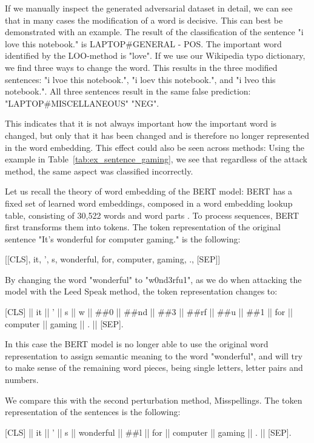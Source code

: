 If we manually inspect the generated adversarial dataset in detail, we can see that in many cases the modification of a word is decisive. This can best be demonstrated with an example. 
The result of the classification of the sentence "i love this notebook." is LAPTOP\#GENERAL - POS. The important word identified by the LOO-method is "love". If we use our Wikipedia typo dictionary, we find three ways to change the word. This results in the three modified sentences: "i lvoe this notebook.", "i loev this notebook.", and "i lveo this notebook.".
All three sentences result in the same false prediction:
"LAPTOP\#MISCELLANEOUS" "NEG".

This indicates that it is not always important how the important word is changed, but only that it has been changed and is therefore no longer represented in the word embedding. This effect could also be seen across methods: 
Using the example in Table~\ref{tab:ex_sentence_gaming}, we see that regardless of the attack method, the same aspect was classified incorrectly. 

Let us recall the theory of word embedding of the BERT model:
BERT has a fixed set of learned word embeddings, composed in a word embedding lookup table, consisting of 30,522 words and word parts \cite{devlin2018bert}. To process sequences, BERT first transforms them into tokens. The token representation of the original sentence "It’s wonderful for computer gaming." is the following:

\begin{center}
    [{[}CLS{]},  it, ', s, wonderful, for, computer, gaming,  ., {[}SEP{]]}
\end{center}


By changing the word "wonderful" to "w0nd3rfu1", as we do when attacking the model with the Leed Speak method, the token representation changes to:

{[}CLS{]}  ||  it  ||  '  ||  s  ||  w  ||  \#\#0  ||  \#\#nd  ||  \#\#3  ||  \#\#rf  ||  \#\#u  ||  \#\#1  ||  for  ||  computer  ||  gaming  ||  .  ||  {[}SEP{]}.

In this case the BERT model is no longer able to use the original word representation to assign semantic meaning to the word "wonderful", and will try to make sense of the remaining word pieces, being single letters, letter pairs and numbers.

We compare this with the second perturbation method, Misspellings. The token representation of the sentences is the following:

{[}CLS{]}  ||  it  ||  '  ||  s  ||  wonderful  ||  \#\#l  ||  for  ||  computer  ||  gaming  ||  .  ||  {[}SEP{]}.

